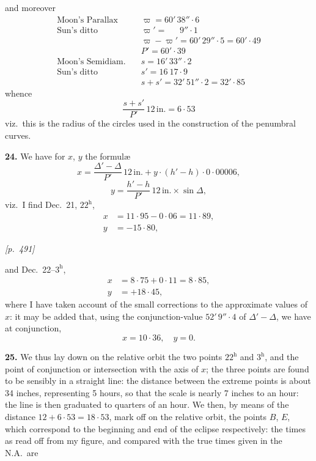 \documentclass[11pt]{article}
\begin{document}
\medskip

\noindent and moreover
\[
\begin{aligned}
\text{Moon's Parallax}\quad &\varpi = 60'\,38''{\cdot}6\\
\text{Sun's ditto}\quad &\varpi' = \phantom{60'\,}9''{\cdot}1\\
&\varpi-\varpi' = 60'\,29''{\cdot}5 = 60'{\cdot}49\\
&P' = 60'{\cdot}39\\
\text{Moon's Semidiam.}\quad &s = 16'\,33''{\cdot}2\\
\text{Sun's ditto}\quad &s' = 16\ 17{\cdot}9\\
&s + s' = 32'\,51''{\cdot}2 = 32'{\cdot}85
\end{aligned}
\]
whence
\[
\frac{s+s'}{P'}\,12\,\text{in.} = 6{\cdot}53
\]
viz.\ this is the radius of the circles used in the construction of the
penumbral curves.

\medskip

\textbf{24.} We have for $x$, $y$ the formul\ae{}
\[
x = \frac{\Delta'-\Delta}{P'}\,12\,\text{in.} + y\cdot(h'-h)\cdot 0{\cdot}00006,
\]
\[
y = \frac{h'-h}{P'}\,12\,\text{in.}\times\sin\Delta,
\]
viz.\ I find Dec.~21, $22^{\mathrm{h}}$,
\[
\begin{aligned}
x &= 11{\cdot}95 - 0{\cdot}06 = 11{\cdot}89,\\
y &= -15{\cdot}80,
\end{aligned}
\]

\medskip

\noindent\textit{[p.~491]}

\medskip

\noindent and Dec.~22--$3^{\mathrm{h}}$,
\[
\begin{aligned}
x &= 8{\cdot}75 + 0{\cdot}11 = 8{\cdot}85,\\
y &= +18{\cdot}45,
\end{aligned}
\]
where I have taken account of the small corrections to the approximate
values of $x$: it may be added that, using the conjunction-value
$52'\,9''{\cdot}4$ of $\Delta'-\Delta$, we have at conjunction,
\[
x = 10{\cdot}36,\quad y = 0.
\]

\medskip

\textbf{25.} We thus lay down on the relative orbit the two points
$22^{\mathrm{h}}$ and $3^{\mathrm{h}}$, and the point of conjunction or
intersection with the axis of $x$; the three points are found to be
sensibly in a straight line: the distance between the extreme points is
about 34 inches, representing 5 hours, so that the scale is nearly 7
inches to an hour: the line is then graduated to quarters of an hour.
We then, by means of the distance $12 + 6{\cdot}53 = 18{\cdot}53$, mark
off on the relative orbit, the points $B$, $E$, which correspond to the
beginning and end of the eclipse respectively: the times as read off
from my figure, and compared with the true times given in the N.A.\ are
\end{document}
